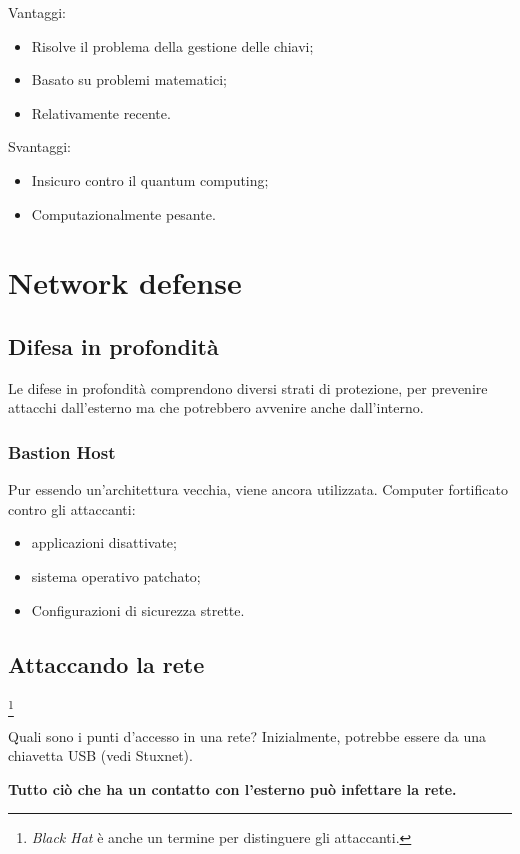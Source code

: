 Vantaggi:
\begin{itemize}
\item Risolve il problema della gestione delle chiavi;
\item Basato su problemi matematici;
\item Relativamente recente.
\end{itemize}

Svantaggi:
\begin{itemize}
\item Insicuro contro il quantum computing;
\item Computazionalmente pesante.
\end{itemize}


\section{Network defense}

\subsection{Difesa in profondità}

Le difese in profondità comprendono diversi strati di protezione, per prevenire
attacchi dall'esterno ma che potrebbero avvenire anche dall'interno.

\subsubsection{Bastion Host}

Pur essendo un'architettura vecchia, viene ancora utilizzata.
Computer fortificato contro gli attaccanti:
\begin{itemize}
\item applicazioni disattivate;
\item sistema operativo patchato;
\item Configurazioni di sicurezza strette.
\end{itemize}

\subsection{Attaccando la rete}\footnote{\textit{Black Hat} è anche un termine
per distinguere gli attaccanti.}

Quali sono i punti d'accesso in una rete? Inizialmente, potrebbe essere da una
chiavetta USB (vedi Stuxnet).

\textbf{Tutto ciò che ha un contatto con l'esterno può infettare la rete.}

